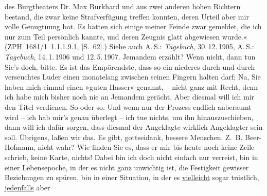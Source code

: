 \begin{ledgroupsized}[t]{13cm}
{{{                     des Burgtheaters Dr. Max Burkhard und aus zwei anderen hohen Richtern
                     bestand, die zwar keine Strafverfügung treffen konnten, deren Urteil aber mir
                     volle Genugtuung bot. Es hatten sich einige meiner Feinde zwar gemeldet, die
                     ich nur zum Teil persönlich kannte, und deren Zeugnis glatt abgewiesen
                     wurde.« (ZPH 1681/1 1.1.1.9.1, [S. 62].) Siehe auch A. S.: \emph{Tagebuch}, 30. 12. 1905, A. S.: \emph{Tagebuch}, 14. 1. 1906 und 12. 5. 1907.}}}\label{K_L03415-6h}
               Jemandem erzählt? Wenn nicht, dann tun Sie’s doch, bitte. Es ist das Empörendste,
               dass so ein niederes {\pb}durch und
               durch verseuchtes Luder einen monatelang zwischen seinen Fingern halten darf; Na, Sie
               haben mich einmal einen »guten Hasser« genannt, – nicht ganz mit Recht, denn ich habe
               mich bisher noch nie an Jemandem gerächt. Aber diesmal will ich mir den Titel
               verdienen. So oder so. Und wenn nur der Prozess endlich anberaumt wird – ich hab
               mir’s genau überlegt – ich tue nichts, um ihn hinauszuschieben, dann will ich dafür
               sorgen, dass diesmal der Angeklagte wirklich Angeklagter sein soll.\pend
           \pstart
           Übrigens, laßen wir das. Es gibt, gottseidank, bessere Menschen. Z. B. Beer-Hofmann, nicht wahr? Wie finden Sie es,
               dass er mir bis heute noch keine Zeile schrieb, keine
               Karte, nichts! Dabei bin ich doch nicht einfach nur verreist, bin in einer
               Lebensepoche, in der es nicht ganz unwichtig ist, die Festigkeit gewisser Beziehungen
               zu spüren, bin in einer Situation, in der es \uline{vielleicht} sogar tröstlich, \uline{jedenfalls} aber

\end{ledgroupsized}
